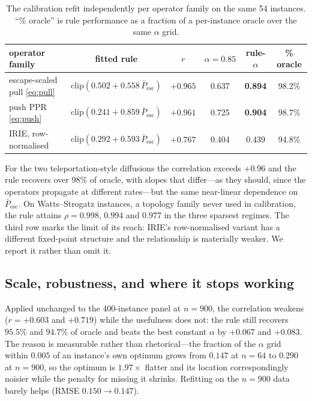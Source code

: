 \documentclass[11pt,a4paper]{article}
\newcommand{\Pescbar}{\bar{P}_{\mathrm{esc}}}
\newcommand{\clip}{\mathrm{clip}}
\begin{document}
\begin{table}[h]
\centering\small
\caption{The calibration refit independently per operator family on the same 54
instances. ``\% oracle'' is rule performance as a fraction of a per-instance
oracle over the same $\alpha$ grid.}
\label{tab:transfer}
\begin{tabular}{lccccc}
\toprule
operator family & fitted rule & $r$ & $\alpha{=}0.85$ & rule-$\alpha$ & \% oracle \\
\midrule
escape-scaled pull \eqref{eq:pull} & $\clip(0.502+0.558\,\Pescbar)$ & $+0.965$ & 0.637 & \textbf{0.894} & 98.2\% \\
push PPR \eqref{eq:push}           & $\clip(0.241+0.859\,\Pescbar)$ & $+0.961$ & 0.725 & \textbf{0.904} & 98.7\% \\
IRIE, row-normalised \cite{irie12} & $\clip(0.292+0.593\,\Pescbar)$ & $+0.767$ & 0.404 & 0.439 & 94.8\% \\
\bottomrule
\end{tabular}
\end{table}

For the two teleportation-style diffusions the correlation exceeds $+0.96$ and
the rule recovers over $98\%$ of oracle, with slopes that differ---as they
should, since the operators propagate at different rates---but the same
near-linear dependence on $\Pescbar$. On Watts--Strogatz instances, a topology
family never used in calibration, the rule attains $\rho=0.998$, $0.994$ and
$0.977$ in the three sparsest regimes. The third row marks the limit of its
reach: IRIE's row-normalised variant has a different fixed-point structure and
the relationship is materially weaker. We report it rather than omit it.

\subsection{Scale, robustness, and where it stops working}

Applied unchanged to the 400-instance panel at $n=900$, the correlation weakens
($r=+0.603$ and $+0.719$) while the usefulness does not: the rule still recovers
$95.5\%$ and $94.7\%$ of oracle and beats the best constant $\alpha$ by $+0.067$
and $+0.083$. The reason is measurable rather than rhetorical---the fraction of
the $\alpha$ grid within $0.005$ of an instance's own optimum grows from $0.147$
at $n=64$ to $0.290$ at $n=900$, so the optimum is $1.97\times$ flatter and its
location correspondingly noisier while the penalty for missing it shrinks.
Refitting on the $n=900$ data barely helps (RMSE $0.150\to0.147$).
\end{document}
